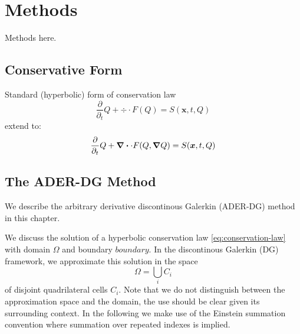 \chapter{Methods}
Methods here.

\newcommand{\Qrho}{\rho}
\newcommand{\Qj}{\rho \bm{v}}
\newcommand{\Qv}{\bm{v}}
\newcommand{\QE}{\rho E}
\newcommand{\potT}{\theta}
\newcommand{\backgroundPotT}{\overline{\theta}}
\newcommand{\pertubationPotT}{\theta'}
\newcommand{\stressT}{\bm{\sigma}}
\newcommand{\pressure}{p}
\newcommand{\maxConvEigen}{\vert \lambda_c^{\text{max}} \vert}
\newcommand{\maxViscEigen}{\vert \lambda_v^{\text{max}} \vert}

\newcommand{\domain}{\Omega}
\newcommand{\broken}{\domain}
\newcommand{\cell}[1][i]{C_{#1}}
\newcommand{\boundary}{\partial \domain}
\newcommand{\sbasis}[1]{\Phi_{#1}}
\newcommand{\testfunction}[1]{\Phi_{#1}}

\section{Conservative Form}
Standard (hyperbolic) form of conservation law
\begin{equation}
  \label{eq:conservation-law}
 \frac{\partial}{\partial_t}  Q + \div \cdot F(Q) = S(\bm{x}, t, Q)
\end{equation}
extend to:
\begin{equation}
  \label{eq:conservation-law-gradient}
 \frac{\partial}{\partial_t}  Q + \div \cdot F(Q, \grad Q) = S(\bm{x}, t, Q)
\end{equation}

\section{The ADER-DG Method}
\label{sec:ader-dg}
We describe the arbitrary derivative discontinous Galerkin (ADER-DG) method in this chapter.

We discuss the solution of a hyperbolic conservation law \cref{eq:conservation-law} with domain $\domain$ and boundary $boundary$.
In the discontinous Galerkin (DG) framework, we approximate this solution in the space
\begin{equation}
  \label{eq:dg-space}
  \broken = \bigcup_i \cell
\end{equation}
of disjoint quadrilateral cells $\cell$.
Note that we do not distinguish between the approximation space and the domain, the use should be clear given its surrounding context.
In the following we make use of the Einstein summation convention where summation over repeated indexes is implied.

